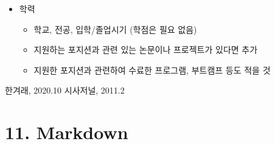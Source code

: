 \documentclass{article}
\begin{document}
\begin{itemize}
\begin{itemize}
\begin{itemize}
        \end{itemize}
        \item 학력
        \begin{itemize}
            \item 학교, 전공, 입학/졸업시기 (학점은 필요 없음)
            \item 지원하는 포지션과 관련 있는 논문이나 프로젝트가 있다면 추가
            \item 지원한 포지션과 관련하여 수료한 프로그램, 부트캠프 등도 적을 것
        \end{itemize}
    \end{itemize}
\end{itemize}

\begin{thebibliography}{10}
     한겨래, 2020.10
     시사저널, 2011.2
\end{thebibliography}

\section{11. Markdown}
\end{document}
